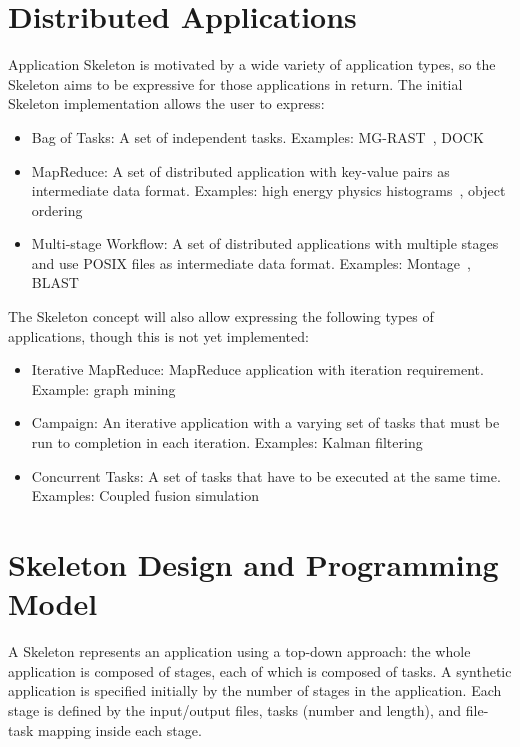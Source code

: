 \documentclass{sig-alternate}
\newcommand{\katznote}[1]{ {\textcolor{blue}    { ***Dan:      #1 }}}
\newcommand{\zhaonote}[1]{{\textcolor{darkgreen}    { ***Zhao:      #1 }}}
\newcommand{\katznote}[1]{}
\newcommand{\zhaonote}[1]{}
\newenvironment{shortlist}{
        \vspace*{-0.5em}
  \begin{itemize}
  \setlength{\itemsep}{-0.1em}
}{
  \end{itemize}
        \vspace*{-0.5em}
}
\begin{document}
\section{Distributed Applications} \label{sec:apps}
Application Skeleton is motivated by a wide variety of application types, so the Skeleton aims to be
expressive for those applications in return. The initial Skeleton implementation
allows the user to express:
\begin{shortlist}
\item {Bag of Tasks}: A set of independent tasks. Examples: MG-RAST~\cite{MG-RAST}, DOCK~\cite{dock5-06}
\item {MapReduce}: A set of distributed application with key-value pairs as intermediate data format. Examples: high energy physics histograms~\cite{SCIMP}, object ordering~\cite{PageRank2}
\item {Multi-stage Workflow}: A set of distributed applications with multiple stages and use POSIX files as intermediate data format. Examples: Montage~\cite{montage1}, BLAST~\cite{ParallelBlast}
\end{shortlist}

The Skeleton concept will also allow expressing the following types of applications, though
this is not yet implemented:
\begin{shortlist}
\item {Iterative MapReduce}: MapReduce application with iteration requirement. Example: %
graph mining~\cite{PREGEL}
\item {Campaign}: An iterative application with a varying set of tasks that must be run to completion in each iteration. Examples: Kalman filtering~\cite{KALMAN}
\item {Concurrent Tasks}: A set of tasks that have to be executed at the same time. Examples: Coupled fusion simulation~\cite{klasky:journphy:2005}
\end{shortlist}


\section{Skeleton Design and Programming Model} \label{sec:design-model}

A Skeleton represents an application using a top-down approach: the whole application is composed of stages, each of which is composed of tasks.
A synthetic application is specified initially by the number of stages in the application. Each stage is defined by the input/output files, tasks (number and length), and file-task mapping inside each stage.
\end{document}
